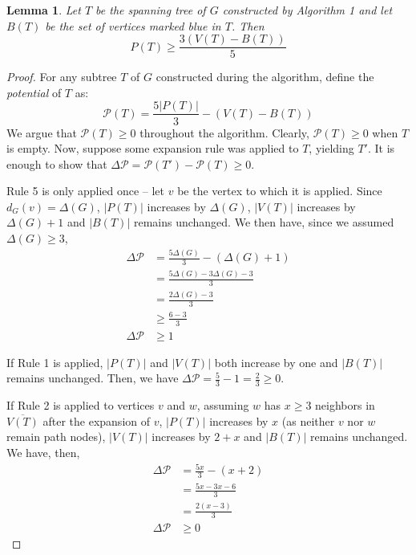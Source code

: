 \documentclass[12pt]{article}
\newtheorem{lemma}[theorem]{Lemma}
\begin{document}
\begin{lemma}
  Let $T$ be the spanning tree of $G$ constructed by Algorithm 1 and let $B(T)$ be the set of vertices marked blue in $T$.
  Then
  $$ P(T) \ge \frac{3(V(T) - B(T))}{5} $$
\end{lemma}
\begin{proof}
  For any subtree $T$ of $G$ constructed during the algorithm, define the \emph{potential} of $T$ as:
  $$ \mathcal{P}(T) = \frac{5|P(T)|}{3} - (V(T) - B(T)) $$
  We argue that $\mathcal{P}(T) \ge 0$ throughout the algorithm.
  Clearly, $\mathcal{P}(T) \ge 0$ when $T$ is empty.
  Now, suppose some expansion rule was applied to $T$, yielding $T'$.
  It is enough to show that $\Delta \mathcal{P} = \mathcal{P}(T') - \mathcal{P}(T) \ge 0$.

  Rule 5 is only applied once -- let $v$ be the vertex to which it is applied.
  Since $d_G(v) = \Delta(G)$, $|P(T)|$ increases by $\Delta(G)$, $|V(T)|$ increases by $\Delta(G) + 1$ and $|B(T)|$ remains unchanged.
  We then have, since we assumed $\Delta(G) \ge 3$,
  \begin{align*}
    \Delta \mathcal{P} &= \frac{5\Delta(G)}{3} - (\Delta(G) + 1) \\
                       &= \frac{5\Delta(G) - 3\Delta(G) - 3}{3} \\
                       &= \frac{2\Delta(G) - 3}{3} \\
                       &\ge \frac{6 - 3}{3} \\
    \Delta \mathcal{P} &\ge 1
  \end{align*}

  If Rule 1 is applied, $|P(T)|$ and $|V(T)|$ both increase by one and $|B(T)|$ remains unchanged.
  Then, we have $\Delta \mathcal{P} = \frac{5}{3} - 1 = \frac{2}{3} \ge 0$.

  If Rule 2 is applied to vertices $v$ and $w$, assuming $w$ has $x \ge 3$ neighbors in $\overline{V(T)}$ after the expansion of $v$, $|P(T)|$ increases by $x$ (as neither $v$ nor $w$ remain path nodes), $|V(T)|$ increases by $2 + x$ and $|B(T)|$ remains unchanged.
  We have, then,
  \begin{align*}
    \Delta \mathcal{P} &= \frac{5x}{3} - (x + 2) \\
                       &= \frac{5x - 3x - 6}{3}\\
                       &= \frac{2(x - 3)}{3} \\
    \Delta \mathcal{P} &\ge 0
  \end{align*}


\end{proof}
\end{document}
